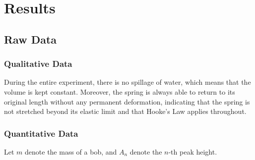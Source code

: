 \documentclass[a4paper,12pt]{article}
\begin{document}
\pagebreak

\section{Results}

\subsection{Raw Data}

\subsubsection{Qualitative Data}
During the entire experiment, there is no spillage of water, which means that the volume is kept constant. Moreover, the spring is always able to return to its original length without any permanent deformation, indicating that the spring is not stretched beyond its elastic limit and that Hooke's Law applies throughout.

\subsubsection{Quantitative Data}

Let $m$ denote the mass of a bob, and $A_n$ denote the $n$-th peak height.
\end{document}
